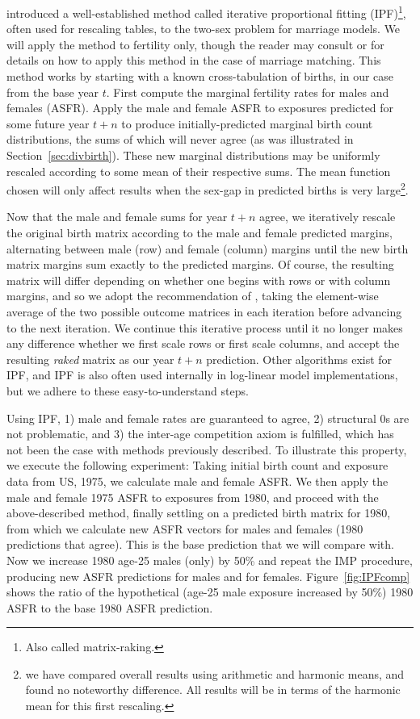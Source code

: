 \FloatBarrier
\citet{mc1975models} introduced a well-established method called iterative
proportional fitting (IPF)\footnote{Also called matrix-raking.}, often used for
rescaling tables, to the two-sex problem for marriage models. We will apply
the method to fertility only, though the reader may consult
\citet{mc1975models} or \citet{Matthews2013} for details on how to apply
this method in the case of marriage matching. This method works by starting with
a known cross-tabulation of births, in our case from the base year $t$. First compute 
the marginal fertility rates for males and females (ASFR). Apply the male and
female ASFR to exposures predicted for some future year $t+n$ to produce
initially-predicted marginal birth count distributions, the sums of which will 
never agree (as was illustrated in Section~\ref{sec:divbirth}). These new
marginal distributions may be uniformly rescaled according to some mean of their
respective sums. The mean function chosen will only affect results when the
sex-gap in predicted births is very large\footnote{we have compared overall
results using arithmetic and harmonic means, and found no noteworthy difference. 
All results will be in terms of the harmonic mean for this first rescaling.}.

Now that the male and female sums for year $t+n$ agree, we iteratively
rescale the original birth matrix according to the male and female
predicted margins, alternating between male (row) and female (column) margins
until the new birth matrix margins sum exactly to the predicted margins. Of
course, the resulting matrix will differ depending on whether one begins with
rows or with column margins, and so we adopt the recommendation of
\citet{Matthews2013}, taking the element-wise average of the two
possible outcome matrices in each iteration before advancing to the next
iteration. We continue this iterative process until it no longer makes any
difference whether we first scale rows or first scale columns, and accept the
resulting \textit{raked} matrix as our year $t+n$ prediction. Other algorithms
exist for IPF, and IPF is also often used internally in log-linear model
implementations, but we adhere to these easy-to-understand steps.

Using IPF, 1) male and female rates are guaranteed to agree, 2) structural 0s
are not problematic, and 3) the inter-age competition axiom is fulfilled,
which has not been the case with methods previously described. To illustrate
this property, we execute the following experiment: Taking initial birth count
and exposure data from US, 1975, we calculate male and female ASFR. We then
apply the male and female 1975 ASFR to exposures from 1980, and proceed with the
above-described method, finally settling on a predicted birth matrix for 1980,
from which we calculate new ASFR vectors for males and females (1980
predictions that agree). This is the base prediction that we will compare with.
Now we increase 1980 age-25 males (only) by 50\% and repeat the IMP procedure,
producing new ASFR predictions for males and for females.
Figure~\ref{fig:IPFcomp} shows the ratio of the hypothetical (age-25 male
exposure increased by 50\%) 1980 ASFR to the base 1980 ASFR prediction.

